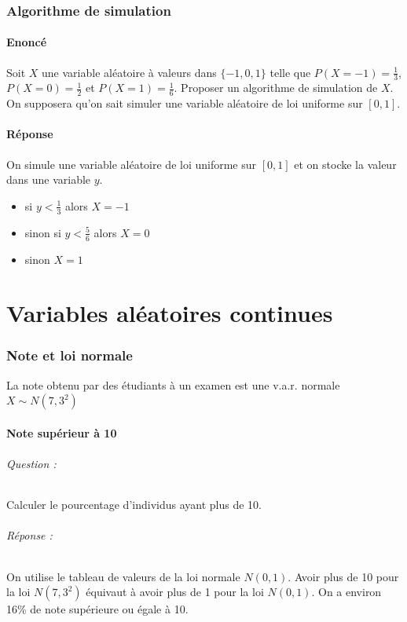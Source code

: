 \documentclass[10pt,a4paper,twoside]{article}
\begin{document}
\section{Algorithme de simulation}
\subsection*{Enoncé}
Soit $X$ une variable aléatoire à valeurs dans $\{-1,0,1\}$ telle que $P(X=-1)=\frac{1}{3}$, $P(X=0)=\frac{1}{2}$ et $P(X=1)=\frac{1}{6}$. Proposer un algorithme de simulation de $X$. On supposera qu'on sait simuler une variable aléatoire de loi uniforme sur $[0,1]$.

\subsection*{Réponse}
On simule une variable aléatoire de loi uniforme sur $[0,1]$ et on stocke la valeur dans une variable $y$.
\begin{itemize}
\item si $y<\frac{1}{3}$ alors $X=-1$
\item sinon si $y<\frac{5}{6}$ alors $X=0$
\item sinon $X=1$
\end{itemize}

\newpage
\part{Variables aléatoires continues}
\setcounter{section}{0}
\section{Note et loi normale}
La note obtenu par des étudiants à un examen est une v.a.r. normale $X\sim N(7,3^{2})$
\subsection{Note supérieur à 10}
\paragraph{Question :} Calculer le pourcentage d'individus ayant plus de 10.

\paragraph{Réponse :} On utilise le tableau de valeurs de la loi normale $N(0,1)$. Avoir plus de 10 pour la loi $N(7,3^{2})$ équivaut à avoir plus de 1 pour la loi $N(0,1)$. On a environ 16\% de note supérieure ou égale à 10.
\end{document}
